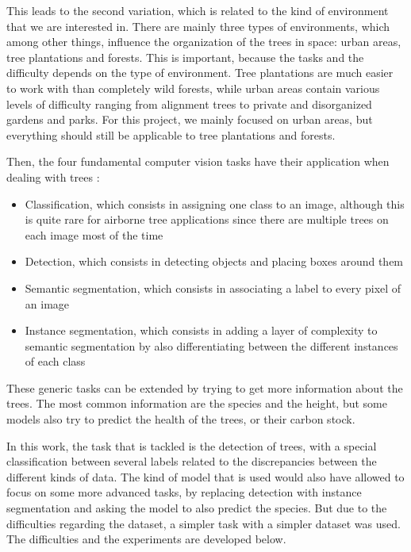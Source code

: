 \documentclass[
  letterpaper,
  DIV=11,
  numbers=noendperiod]{scrartcl}
\providecommand{\tightlist}{%
  \setlength{\itemsep}{0pt}\setlength{\parskip}{0pt}}\usepackage{longtable,booktabs,array}
\begin{document}
This leads to the second variation, which is related to the kind of
environment that we are interested in. There are mainly three types of
environments, which among other things, influence the organization of
the trees in space: urban areas, tree plantations and forests. This is
important, because the tasks and the difficulty depends on the type of
environment. Tree plantations are much easier to work with than
completely wild forests, while urban areas contain various levels of
difficulty ranging from alignment trees to private and disorganized
gardens and parks. For this project, we mainly focused on urban areas,
but everything should still be applicable to tree plantations and
forests.

Then, the four fundamental computer vision tasks have their application
when dealing with trees \autocite{olive-tree}:

\begin{itemize}
\tightlist
\item
  Classification, which consists in assigning one class to an image,
  although this is quite rare for airborne tree applications since there
  are multiple trees on each image most of the time
\item
  Detection, which consists in detecting objects and placing boxes
  around them
\item
  Semantic segmentation, which consists in associating a label to every
  pixel of an image
\item
  Instance segmentation, which consists in adding a layer of complexity
  to semantic segmentation by also differentiating between the different
  instances of each class
\end{itemize}

These generic tasks can be extended by trying to get more information
about the trees. The most common information are the species and the
height, but some models also try to predict the health of the trees, or
their carbon stock.

In this work, the task that is tackled is the detection of trees, with a
special classification between several labels related to the
discrepancies between the different kinds of data. The kind of model
that is used would also have allowed to focus on some more advanced
tasks, by replacing detection with instance segmentation and asking the
model to also predict the species. But due to the difficulties regarding
the dataset, a simpler task with a simpler dataset was used. The
difficulties and the experiments are developed below.
\end{document}
